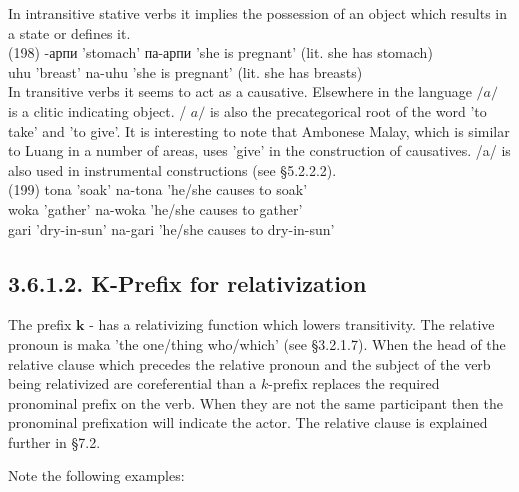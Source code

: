 \documentclass[10pt]{article}
\begin{document}
In intransitive stative verbs it implies the possession of an object which results in a state or defines it.\\
(198) -арпи 'stomach' па-арпи 'she is pregnant' (lit. she has stomach)\\
uhu 'breast' na-uhu 'she is pregnant' (lit. she has breasts)\\
In transitive verbs it seems to act as a causative. Elsewhere in the language \(/ a /\) is a clitic indicating object. / \(a /\) is also the precategorical root of the word 'to take' and 'to give'. It is interesting to note that Ambonese Malay, which is similar to Luang in a number of areas, uses 'give' in the construction of causatives. /a/ is also used in instrumental constructions (see §5.2.2.2).\\
(199) tona 'soak' na-tona 'he/she causes to soak'\\
woka 'gather' na-woka 'he/she causes to gather'\\
gari 'dry-in-sun' na-gari 'he/she causes to dry-in-sun'

\subsection*{3.6.1.2. K-Prefix for relativization}
The prefix \(\boldsymbol{k}\) - has a relativizing function which lowers transitivity. The relative pronoun is maka 'the one/thing who/which' (see §3.2.1.7). When the head of the relative clause which precedes the relative pronoun and the subject of the verb being relativized are coreferential than a \(k\)-prefix replaces the required pronominal prefix on the verb. When they are not the same participant then the pronominal prefixation will indicate the actor. The relative clause is explained further in §7.2.

Note the following examples:
\end{document}

